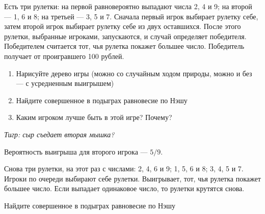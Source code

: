 \begin{problem}[Рулетки {[О]}]\par
\begin{source} \cite{binmore:fg} \end{source}
Есть три рулетки: на первой равновероятно выпадают числа 2, 4 и 9; на второй --- 1, 6 и 8; на третьей --- 3, 5 и 7. Сначала первый игрок выбирает рулетку себе, затем второй игрок выбирает рулетку себе из двух оставшихся. После этого рулетки, выбранные игроками, запускаются, и случай определяет победителя. Победителем считается тот, чья рулетка покажет большее число. Победитель получает от проигравшего 100 рублей.\par
\begin{enumerate}
\item Нарисуйте дерево игры (можно со случайным ходом природы, можно и без --- с усредненным выигрышем)
\item Найдите совершенное в подыграх равновесие по Нэшу
\item Каким игроком лучше быть в этой игре? Почему?
\end{enumerate}
{\it Тигр: сыр съедает вторая мышка?}



\begin{sol}
Вероятность выигрыша для второго игрока --- $5/9$.
\end{sol}
\end{problem}



\begin{problem}[Рулетки]\par
\begin{source} \cite{binmore:fg} \end{source}
Снова три рулетки, на этот раз с числами: 2, 4, 6 и 9; 1, 5, 6 и 8; 3, 4, 5 и 7. Игроки по очереди выбирают себе рулетки. Выигрывает, тот, чья рулетка покажет большее число. Если выпадает одинаковое число, то рулетки крутятся снова.\par
Найдите совершенное в подыграх равновесие по Нэшу

\begin{sol}

\end{sol}
\end{problem}



